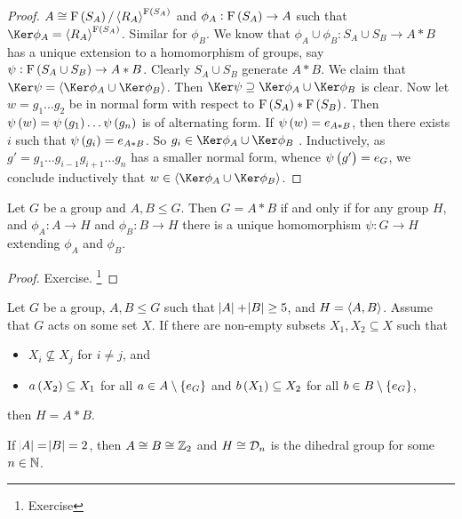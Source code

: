 \begin{proof}
$ A \cong \F\br{S_A} / \abr{R_A}^{\F\br{S_A}} $ and $ \phi_A : \F\br{S_A} \to A $ such that $ \Ker \phi_A = \abr{R_A}^{\F\br{S_A}} $. Similar for $ \phi_B $. We know that $ \phi_A \cup \phi_B : S_A \cup S_B \to A * B $ has a unique extension to a homomorphism of groups, say $ \psi : \F\br{S_A \cup S_B} \to A * B $. Clearly $ S_A \cup S_B $ generate $ A * B $. We claim that $ \Ker \psi = \abr{\Ker \phi_A \cup \Ker \phi_B} $. Then $ \Ker \psi \supseteq \Ker \phi_A \cup \Ker \phi_B $ is clear. Now let $ w = g_1 \dots g_2 $ be in normal form with respect to $ \F\br{S_A} * \F\br{S_B} $. Then $ \psi\br{w} = \psi\br{g_1} \dots \psi\br{g_n} $ is of alternating form. If $ \psi\br{w} = e_{A * B} $, then there exists $ i $ such that $ \psi\br{g_i} = e_{A * B} $. So $ g_i \in \Ker \phi_A \cup \Ker \phi_B $ . Inductively, as $ g' = g_1 \dots g_{i - 1}g_{i + 1} \dots g_n $ has a smaller normal form, whence $ \psi\br{g'} = e_G $, we conclude inductively that $ w \in \abr{\Ker \phi_A \cup \Ker \phi_B} $.
\end{proof}

\begin{proposition}
Let $ G $ be a group and $ A, B \le G $. Then $ G = A * B $ if and only if for any group $ H $, and $ \phi_A : A \to H $ and $ \phi_B : B \to H $ there is a unique homomorphism $ \psi : G \to H $ extending $ \phi_A $ and $ \phi_B $.
\end{proposition}

\begin{proof}
Exercise. \footnote{Exercise}
\end{proof}

\begin{lemma}
Let $ G $ be a group, $ A, B \le G $ such that $ \abs{A} + \abs{B} \ge 5 $, and $ H = \left\langle A, B \right\rangle $. Assume that $ G $ acts on some set $ X $. If there are non-empty subsets $ X_1, X_2 \subseteq X $ such that
\begin{itemize}
\item $ X_i \not\subseteq X_j $ for $ i \ne j $, and
\item $ a\br{X_2} \subseteq X_1 $ for all $ a \in A \setminus \cbr{e_G} $ and $ b\br{X_1} \subseteq X_2 $ for all $ b \in B \setminus \cbr{e_G} $,
\end{itemize}
then $ H = A * B $.
\end{lemma}

\begin{remark}
If $ \abs{A} = \abs{B} = 2 $, then $ A \cong B \cong \mathbb{Z}_2 $ and $ H \cong \mathcal{D}_n $ is the dihedral group for some $ n \in \mathbb{N} $.
\end{remark}

